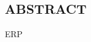 \begin{center}
\section*{ABSTRACT}
\end{center}
\begin{normalsize}
\doublespacing
ERP
\end{normalsize}
